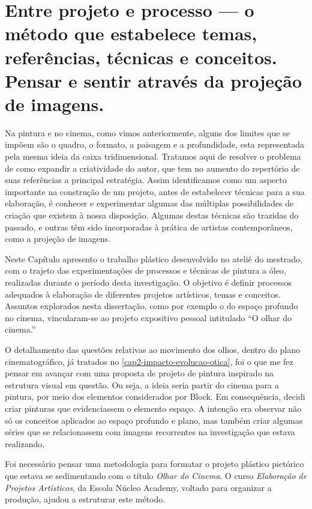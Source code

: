 \chapter{Entre projeto e processo --- o método que
  estabelece temas, referências, técnicas e conceitos. Pensar e sentir
  através da projeção de imagens.}%
\label{cap4-entre-projeto-processo}

Na pintura e no cinema, como vimos anteriormente, alguns dos limites
que se impõem são o quadro, o formato, a paisagem e a profundidade,
esta representada pela mesma ideia da caixa tridimensional. Tratamos
aqui de resolver o problema de como expandir a criatividade do autor,
que tem no aumento do repertório de suas referências a principal
estratégia. Assim identificamos como um aspecto importante na
construção de um projeto, antes de estabelecer técnicas para a sua
elaboração, é conhecer e experimentar algumas das múltiplas
possibilidades de criação que existem à nossa disposição. Algumas
destas técnicas são trazidas do passado, e outras têm sido incorporadas
à prática de artistas contemporâneos, como a projeção de imagens.

Neste Capítulo apresento o trabalho plástico desenvolvido no ateliê do
mestrado, com o trajeto das experimentações de processos e técnicas de
pintura a óleo, realizadas durante o período desta investigação. O
objetivo é definir processos adequados à elaboração de diferentes
projetos artísticos, temas e conceitos. Assuntos explorados nesta
dissertação, como por exemplo o do espaço profundo no cinema,
vincularam-se ao projeto expositivo pessoal intitulado \enquote{O olhar
	do cinema.}

O detalhamento das questões relativas ao movimento dos olhos, dentro do
plano cinematográfico, já tratados no
\cref{cap2-impacto-evolucao-otica}, foi o que me fez pensar em avançar
com uma proposta de projeto de pintura inspirado na estrutura visual em
questão. Ou seja, a ideia seria partir do cinema para a pintura, por
meio dos elementos considerados por Block. Em consequência, decidi
criar pinturas que evidenciassem o elemento espaço. A intenção era
observar não só os conceitos aplicados ao espaço profundo e plano, mas
também criar algumas séries que se relacionassem com imagens
recorrentes na investigação que estava realizando.

Foi necessário pensar uma metodologia para formatar o projeto plástico
pictórico que estava se sedimentando com o título \emph{Olhar do
	Cinema}. O curso \emph{Elaboração de Projetos Artísticos}, da Escola
Núcleo Academy, voltado para organizar a produção, ajudou a estruturar
este método.

